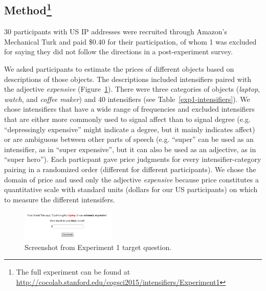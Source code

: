 \documentclass[10pt,letterpaper]{article}
\newcommand{\w}[1]{\emph{#1}}
\begin{document}
\subsection{Method\footnote{The full experiment can be found at \url{http://cocolab.stanford.edu/cogsci2015/intensifiers/Experiment1}}}

30 participants with US IP addresses were recruited through Amazon's Mechanical Turk and paid \$0.40 for their participation, of whom 1 was excluded for saying they did not follow the directions in a post-experiment survey.

We asked participants to estimate the prices of different objects based on %
descriptions of those objects. The descriptions included intensifiers paired with the adjective \w{expensive} (Figure~\ref{exp1-q}).
There were three categories of objects (\emph{laptop}, \emph{watch}, and \emph{coffee maker}) and 40 intensifiers (see Table~\ref{exp1-intensifiers}).
We chose intensifiers that have a wide range of frequencies and excluded intensifiers that are either more commonly used to signal affect than to signal degree (e.g. ``depressingly expensive'' might indicate a degree, but it mainly indicates affect) or are ambiguous between other parts of speech (e.g. ``super'' can be used as an intensifier, as in ``super expensive'', but it can also be used as an adjective, as in ``super hero'').
Each particpant gave price judgments for every intensifier-category pairing in a randomized order (different for different participants).%
We chose the domain of price and used only the adjective \w{expensive} because price constitutes a quantitative scale with standard units (dollars for our US participants) on which to measure the different intensifers.

\begin{figure}[htb]
\begin{center}
\includegraphics[width=0.4\textwidth]{analysis_files_for_writeup/images/exp1-q.png}
\end{center}
\caption{Screenshot from Experiment 1 target question.} 
\label{exp1-q}
\end{figure}
\end{document}
